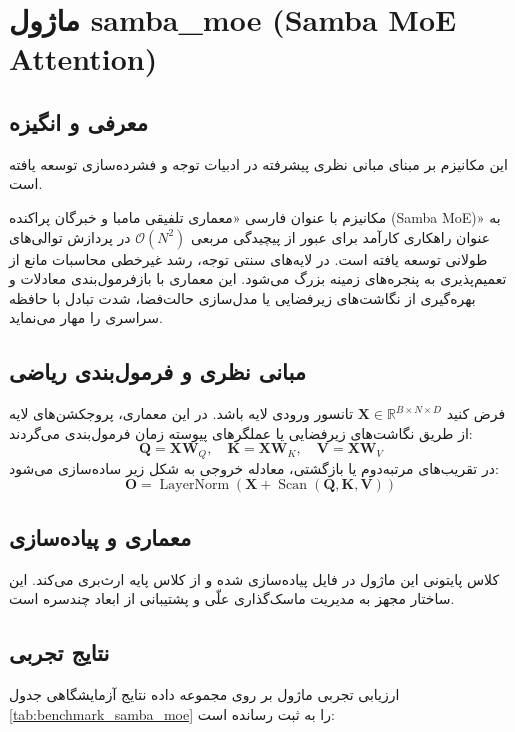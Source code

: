 \section{ماژول samba\_moe (Samba MoE Attention)}
\label{sec:module_samba_moe}

\subsection{معرفی و انگیزه}
این مکانیزم بر مبنای مبانی نظری پیشرفته در ادبیات توجه و فشرده‌سازی \cite{ren2024samba} توسعه یافته است.

مکانیزم  با عنوان فارسی «معماری تلفیقی مامبا و خبرگان پراکنده (Samba MoE)» به عنوان راهکاری کارآمد برای عبور از پیچیدگی مربعی $\mathcal{O}(N^2)$ در پردازش توالی‌های طولانی توسعه یافته است. در لایه‌های سنتی توجه، رشد غیرخطی محاسبات مانع از تعمیم‌پذیری به پنجره‌های زمینه بزرگ می‌شود. این معماری با بازفرمول‌بندی معادلات و بهره‌گیری از نگاشت‌های زیرفضایی یا مدل‌سازی حالت‌فضا، شدت تبادل با حافظه سراسری را مهار می‌نماید.

\subsection{مبانی نظری و فرمول‌بندی ریاضی}
فرض کنید $\mathbf{X} \in \mathbb{R}^{B \times N \times D}$ تانسور ورودی لایه باشد. در این معماری، پروجکشن‌های لایه از طریق نگاشت‌های زیرفضایی یا عملگرهای پیوسته زمان فرمول‌بندی می‌گردند:
 \begin{equation}
\mathbf{Q} = \mathbf{X} \mathbf{W}_Q, \quad \mathbf{K} = \mathbf{X} \mathbf{W}_K, \quad \mathbf{V} = \mathbf{X} \mathbf{W}_V
\end{equation}
در تقریب‌های مرتبه‌دوم یا بازگشتی، معادله خروجی به شکل زیر ساده‌سازی می‌شود:
 \begin{equation}
\mathbf{O} = \operatorname{LayerNorm}\left(\mathbf{X} + \operatorname{Scan}(\mathbf{Q}, \mathbf{K}, \mathbf{V})
\right)
\end{equation}

\subsection{معماری و پیاده‌سازی}
کلاس پایتونی این ماژول در فایل  پیاده‌سازی شده و از کلاس پایه  ارث‌بری می‌کند. این ساختار مجهز به مدیریت ماسک‌گذاری علّی و پشتیبانی از ابعاد چندسره است.

\subsection{نتایج تجربی}
ارزیابی تجربی ماژول  بر روی مجموعه داده  نتایج آزمایشگاهی جدول 
\ref{tab:benchmark_samba_moe} را به ثبت رسانده است:

